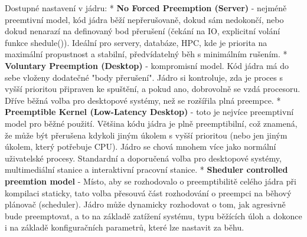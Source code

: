 Dostupné nastavení v jádru:
\begitems 
* {\bf No Forced Preemption (Server)} - nejméně preemtivní model, kód jádra běží nepřerušovaně, dokud sám nedokončí, nebo dokud nenarazí na definovaný bod přerušení (čekání na IO, explicitní volání funkce shedule()). Ideální pro servery, databáze, HPC, kde je priorita na maximální propustnost a stabilní, předvídatelný běh s minimálním rušením. 
* {\bf Voluntary Preemption (Desktop)} - kompromisní model. Kód jádra má do sebe vloženy dodatečné "body přerušení". Jádro si kontroluje, zda je proces s vyšší prioritou připraven ke spuštění, a pokud ano, dobrovolně se vzdá procesoru. Dříve běžná volba pro desktopové systémy, než se rozšířila plná preempce.
* {\bf Preemptible Kernel (Low-Latency Desktop)} - toto je nejvíce preemptivní model pro běžné použití. Většina kódu jádra je plně preemptibilní, což znamená, že může být přerušena kdykoli jiným úkolem s vyšší prioritou (nebo jen jiným úkolem, který potřebuje CPU). Jádro se chová mnohem více jako normální uživatelské procesy. Standardní a doporučená volba pro desktopové systémy, multimediální stanice a interaktivní pracovní stanice.
* {\bf Sheduler controlled preemtion model} - Místo, aby se rozhodovalo o preemptibilitě celého jádra při kompilaci staticky, tato volba přesouvá část rozhodování o preempci na běhový plánovač (scheduler). Jádro může dynamicky rozhodovat o tom, jak agresivně bude preemptovat, a to na základě zatížení systému, typu běžících úloh a dokonce i na základě konfiguračních parametrů, které lze nastavit za běhu.
\enditems
